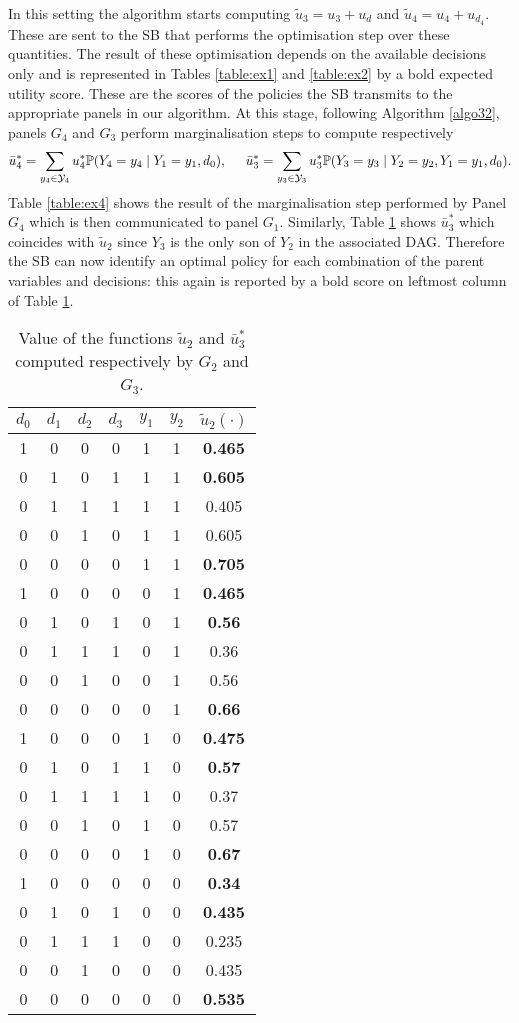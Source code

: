 In this setting the algorithm starts computing $\tilde{u}_3=u_3+u_d$ and $\tilde{u}_4=u_4+u_{d_4}$. These are sent to the SB that performs the optimisation step over these quantities. The result of these optimisation depends on the available decisions only and is represented in Tables \ref{table:ex1} and \ref{table:ex2} by a bold expected utility score. These are the scores of the policies the SB transmits to the appropriate panels in our algorithm.  At this stage, following Algorithm \ref{algo32}, panels $G_4$ and $G_3$ perform marginalisation steps to compute respectively 
\begin{equation*}
\bar{u}_4^*=\sum_{y_4\in\mathcal{Y}_4}u^*_4\mathbb{P}(Y_4=y_4\;|\;Y_1=y_1,d_0),\hspace{0.5cm} \bar{u}_3^*=\sum_{y_3\in\mathcal{Y}_3}u^*_3\mathbb{P}(Y_3=y_3\;|\;Y_2=y_2,Y_1=y_1,d_0).
\end{equation*} 
 Table \ref{table:ex4} shows the result of the marginalisation step performed by Panel $G_4$ which is then communicated to panel $G_1$. Similarly, Table \ref{table:ex5} shows $\bar{u}^*_3$ which  coincides with $\tilde{u}_2$ since $Y_3$ is the only son of $Y_2$ in the associated DAG.  Therefore the SB can now identify an optimal policy for each combination of the parent variables and decisions: this again is reported by a bold score on leftmost column of Table \ref{table:ex5}. 


\begin{table}
\begin{center}
\begin{tabular}{|c|c|c|c|c|c|c|}
\hline
$d_0$&$d_1$&$d_2$&$d_3$&$y_1$&$y_2$&$\tilde{u}_2(\cdot)$\\
\hline\hline
1&0&0&0&1&1&\textbf{0.465}\\
0&1&0&1&1&1&\textbf{0.605}\\
0&1&1&1&1&1&0.405\\
0&0&1&0&1&1&0.605\\
0&0&0&0&1&1&\textbf{0.705}\\
1&0&0&0&0&1&\textbf{0.465}\\
0&1&0&1&0&1&\textbf{0.56}\\
0&1&1&1&0&1&0.36\\
0&0&1&0&0&1&0.56\\
0&0&0&0&0&1&\textbf{0.66}\\
1&0&0&0&1&0&\textbf{0.475}\\
0&1&0&1&1&0&\textbf{0.57}\\
0&1&1&1&1&0&0.37\\
0&0&1&0&1&0&0.57\\
0&0&0&0&1&0&\textbf{0.67}\\
1&0&0&0&0&0&\textbf{0.34}\\
0&1&0&1&0&0&\textbf{0.435}\\
0&1&1&1&0&0&0.235\\
0&0&1&0&0&0&0.435\\
0&0&0&0&0&0&\textbf{0.535}\\
\hline
\end{tabular}
\end{center}
\caption{Value of the functions $\tilde{u}_2$ and $\bar{u}_3^*$ computed respectively by $G_2$ and $G_3$. \label{table:ex5}}
\end{table}

